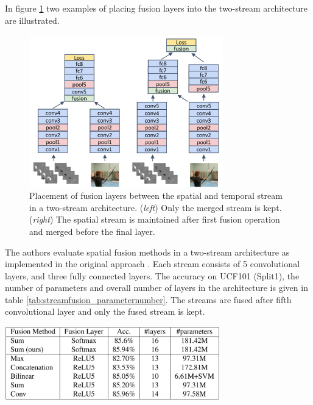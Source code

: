 In figure \ref{fig:streamfusion_layerplacement} two examples of placing fusion layers into the two-stream architecture are illustrated.

\begin{figure}[H]
    \centering
    \includegraphics[width=0.75\textwidth]{img_deep/streamfusion_layerplacement}
    \caption{Placement of fusion layers between the spatial and temporal stream in a two-stream architecture. (\textit{left}) Only the merged stream is kept. (\textit{right}) The spatial stream is maintained after first fusion operation and merged before the final layer. \cite{feichtenhofer_convolutional_2016}}
    \label{fig:streamfusion_layerplacement}
\end{figure}

The authors evaluate spatial fusion methods in a two-stream architecture as implemented in the original approach \cite{simonyan_two-stream_2014}.
Each stream consists of 5 convolutional layers, and three fully connected layers.
The accuracy on UCF101 (Split1), the number of parameters and overall number of layers in the architecture is given in table \ref{tab:streamfusion_parameternumber}.
The streams are fused after fifth convolutional layer and only the fused stream is kept.

\begin{table}[H]
    \centering
    \includegraphics[width=0.7\textwidth]{img_deep/streamfusion_parameternumber}
    \caption{Performance and number of parameters for different spatial fusion methods in a two-stream setup, evaluated on UCF101 (split 1) \cite{feichtenhofer_convolutional_2016}}
    \label{tab:streamfusion_parameternumber}
\end{table}


